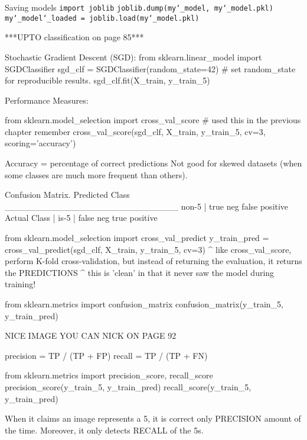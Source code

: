 Saving models\newline
\texttt{import joblib}\newline
\texttt{joblib.dump(my\char`_model, \textquotesingle my\char`_model.pkl\textquotesingle)}\newline
\texttt{my\char`_model\char`_loaded = joblib.load(\textquotesingle my\char`_model.pkl\textquotesingle)}












***UPTO classification on page 85***

Stochastic Gradient Descent (SGD):
from sklearn.linear_model import SGDClassifier
sgd_clf = SGDClassifier(random_state=42) # set random_state for reproducible results.
sgd_clf.fit(X_train, y_train_5)

Performance Measures:

from sklearn.model_selection import cross_val_score # used this in the previous chapter remember
cross_val_score(sgd_clf, X_train, y_train_5, cv=3, scoring='accuracy')

Accuracy = percentage of correct predictions
Not good for skewed datasets (when some classes are much more frequent than others).

Confusion Matrix.
                    Predicted Class
                    ____________________________
             non-5 | true neg     false positive
Actual Class       |
             is-5  | false neg    true positive

from sklearn.model_selection import cross_val_predict             
y_train_pred = cross_val_predict(sgd_clf, X_train, y_train_5, cv=3)
^ like cross_val_score, perform K-fold cross-validation,
but instead of returning the evaluation, it returns the PREDICTIONS
^ this is 'clean' in that it never saw the model during training!

from sklearn.metrics import confusion_matrix
confusion_matrix(y_train_5, y_train_pred)

NICE IMAGE YOU CAN NICK ON PAGE 92

precision = TP / (TP + FP)
recall = TP / (TP + FN)

from sklearn.metrics import precision_score, recall_score
precision_score(y_train_5, y_train_pred)
recall_score(y_train_5, y_train_pred)

When it claims an image represents a 5,
it is correct only PRECISION amount of the time.
Moreover, it only detects RECALL of the 5s.

